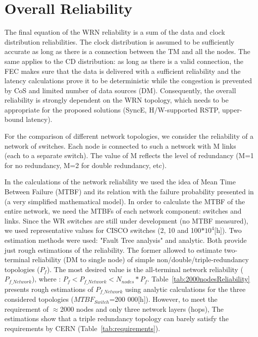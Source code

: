 \section{Overall Reliability}

The final equation of the WRN reliability is a sum of the data and clock distribution reliabilities.
The clock distribution is assumed to be sufficiently accurate as long as there is a connection 
between the TM and all the nodes. The same applies to the CD distribution: 
as long as there is a valid connection, the FEC makes sure that the data is delivered with 
a sufficient reliability and the latency calculations prove it to be deterministic while the 
congestion is prevented by CoS and limited number of data sources (DM). Consequently, the overall 
reliability is strongly dependent on the WRN topology, which needs to be appropriate for the proposed 
solutions (SyncE, H/W-supported RSTP, upper-bound latency). 

For the comparison of different network topologies, we consider the reliability of a network of 
switches. 
Each node is connected to such a network with M links 
(each to a separate switch). The value of M reflects the level of redundancy 
(M=1 for no redundancy, M=2 for double redundancy, etc).


In the calculations of the network reliability we used the idea of Mean Time Between Failure (MTBF) 
and its relation with the failure probability presented in \cite{biblio:mtbf} 
(a very simplified mathematical model). In order to calculate the MTBF of the entire network, we need the 
MTBFs of each network component: switches and links. Since the WR switches are still under 
development (no MTBF measured), we used representative values for CISCO switches 
({2, 10 and 100}$*10^4$[h]). Two estimation methods were used: "Fault Tree analysis" 
\cite{biblio:faultTree} and analytic. Both provide just rough estimations of the reliability. 
The former allowed to estimate two-terminal reliability (DM to single node) 
of simple non/double/triple-redundancy topologies ($P_f$). The most desired value is the 
all-terminal network reliability ($P_{f\_Network}$), where : $P_f < P_{f\_Network} < N_{nodes}*P_f$. 
Table~\ref{tab:2000nodesReliability} 
presents rough estimations of $P_{f\_Network}$ using analytic calculations for the three considered 
topologies ($MTBF_{Switch}$=200 000[h]). However, to meet the requirement of $\approx$2000 nodes and 
only three network layers (hops), 
The estimations show that a triple redundancy topology can barely satisfy the requirements by CERN 
(Table~\ref{tab:requirements}).

